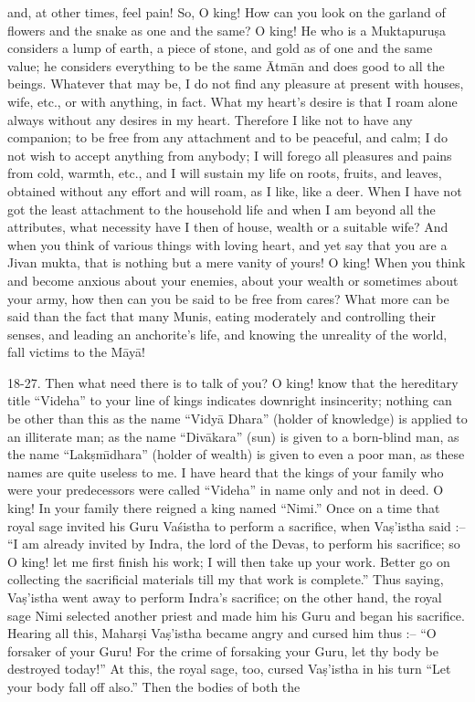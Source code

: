 and, at other times, feel pain! So, O king! How can you look on the garland of flowers and the snake as one and the same? O king! He who is a Muktapuru\d{s}a considers a lump of earth, a piece of stone, and gold as of one and the same value; he considers everything to be the same \=Atm\=an and does good to all the beings. Whatever that may be, I do not find any pleasure at present with houses, wife, etc., or with anything, in fact. What my heart's desire is that I roam alone always without any desires in my heart. Therefore I like not to have any companion; to be free from any attachment and to be peaceful, and calm; I do not wish to accept anything from anybody; I will forego all pleasures and pains from cold, warmth, etc., and I will sustain my life on roots, fruits, and leaves, obtained without any effort and will roam, as I like, like a deer. When I have not got the least attachment to the household life and when I am beyond all the attributes, what necessity have I then of house, wealth or a suitable wife? And when you think of various things with loving heart, and yet say that you are a Jivan mukta, that is nothing but a mere vanity of yours! O king! When you think and become anxious about your enemies, about your wealth or sometimes about your army, how then can you be said to be free from cares? What more can be said than the fact that many Munis, eating moderately and controlling their senses, and leading an anchorite's life, and knowing the unreality of the world, fall victims to the M\=ay\=a!

18-27. Then what need there is to talk of you? O king! know that the hereditary title ``Videha'' to your line of kings indicates downright insincerity; nothing can be other than this as the name ``Vidy\=a Dhara'' (holder of knowledge) is applied to an illiterate man; as the name ``Div\=akara'' (sun) is given to a born-blind man, as the name ``Lak\d{s}m\={\i}dhara'' (holder of wealth) is given to even a poor man, as these names are quite useless to me. I have heard that the kings of your family who were your predecessors were called ``Videha'' in name only and not in deed. O king! In your family there reigned a king named ``Nimi.'' Once on a time that royal sage invited his Guru Va\'sistha to perform a sacrifice, when Va\d{s}'istha said :-- ``I am already invited by Indra, the lord of the Devas, to perform his sacrifice; so O king! let me first finish his work; I will then take up your work. Better go on collecting the sacrificial materials till my that work is complete.'' Thus saying, Va\d{s}'istha went away to perform Indra's sacrifice; on the other hand, the royal sage Nimi selected another priest and made him his Guru and began his sacrifice. Hearing all this, Mahar\d{s}i Va\d{s}'istha became angry and cursed him thus :-- ``O forsaker of your Guru! For the crime of forsaking your Guru, let thy body be destroyed today!'' At this, the royal sage, too, cursed Va\d{s}'istha in his turn ``Let your body fall off also.'' Then the bodies of both the


